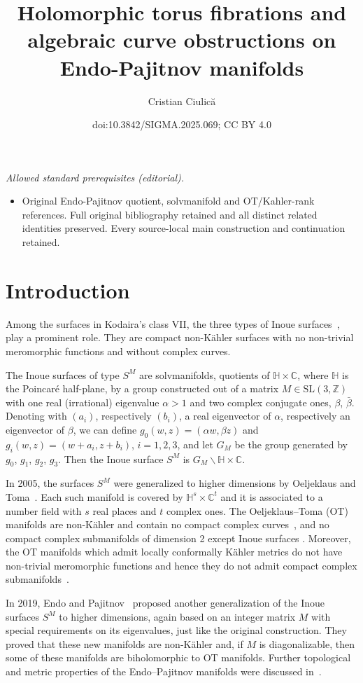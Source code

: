 \documentclass[10pt,a4paper]{amsart}
\title{Holomorphic torus fibrations and algebraic curve obstructions on Endo-Pajitnov manifolds}
\author{Cristian Ciulică}
\date{doi:10.3842/SIGMA.2025.069; CC BY 4.0}
\newcommand{\C}{{\mathbb C}}
\renewcommand{\H}{{\mathbb H}}
\newcommand{\6}{\partial}
\numberwithin{equation}{section}
\begin{document}
\maketitle
\noindent\textit{Allowed standard prerequisites (editorial).}\begin{itemize}
\item Original Endo-Pajitnov quotient, solvmanifold and OT/Kahler-rank references. Full original bibliography retained and all distinct related identities preserved. Every source-local main construction and continuation retained.
\end{itemize}\medskip
\section{Introduction}
	
Among the surfaces in Kodaira's class VII, the three types of Inoue surfaces~\cite{inoue}, play a prominent role. They are compact non-K\"ahler surfaces with no non-trivial meromorphic functions and without complex curves.

 The Inoue surfaces of type $S^M$ are solvmanifolds, quotients of $\H\times\C$, where $\H$ is the Poincar\'e half-plane, by a group constructed out of a matrix $M\in \textrm{SL}(3, \mathbb{Z})$ with one real (irrational) eigenvalue $\alpha>1$ and two complex conjugate ones, $\beta$, $\bar\beta$. Denoting with $(a_i)$, respectively $(b_i)$, a real eigenvector of $\alpha$, respectively an eigenvector of $\beta$, we can define $g_0(w,z)=(\alpha w, \beta z)$ and~${g_i(w,z)=(w+a_i, z+b_i)}$, $i=1,2,3$, and let $G_M$ be the group generated by $g_0$, $g_1$, $g_2$, $g_3$. Then the Inoue surface $S^M$ is $G_M\backslash\H\times\C$.

 In 2005, the surfaces $S^M$ were generalized to higher dimensions by Oeljeklaus and Toma~\cite{ot}. Each such manifold is covered by $\H^s\times \C^t$ and it is associated to a number field with $s$ real places and $t$ complex ones. The Oeljeklaus--Toma (OT) manifolds are non-K\"ahler and contain no compact complex curves~\cite{v_1}, and no compact complex submanifolds of dimension 2 except Inoue surfaces \cite{v_2}. Moreover, the OT manifolds which admit locally conformally K\"ahler metrics do not have non-trivial meromorphic functions and hence they do not admit compact complex submanifolds~\cite{ov}.

 In 2019, Endo and Pajitnov~\cite{pajitnov1} proposed another generalization of the Inoue surfaces $S^M$ to higher dimensions, again based on an integer matrix $M$ with special requirements on its eigenvalues, just like the original construction. They proved that these new manifolds are non-K\"ahler and, if $M$ is diagonalizable, then some of these manifolds are biholomorphic to OT manifolds. Further topological and metric properties of the Endo--Pajitnov manifolds were discussed in~\cite{cos}.
\end{document}
